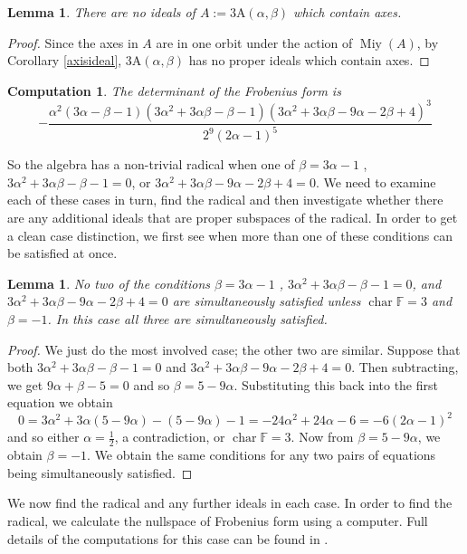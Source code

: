 \documentclass[11pt, a4paper]{article}
\theoremstyle{plain}
\newtheorem{lemma}[theorem]{Lemma}
\newtheorem{computation}[theorem]{Computation}
\theoremstyle{definition}
\newcommand\al{\alpha}
\newcommand\bt{\beta}
\DeclareMathOperator{\ch}{char}
\newcommand\FF{\mathbb{F}}
\newcommand{\A}{\mathrm{A}}
\DeclareMathOperator{\Miy}{Miy}
\newcommand{\0}{\overline{0}}
\newcommand{\2}{\overline{2}}
\newcommand{\1}{\mathbbm{1}}
\begin{document}
\begin{lemma}
There are no ideals of $A := 3\A(\al,\bt)$ which contain axes.
\end{lemma}
\begin{proof}
Since the axes in $A$ are in one orbit under the action of $\Miy(A)$, by Corollary \ref{axisideal}, $3\A(\al,\bt)$ has no proper ideals which contain axes.
\end{proof}

\begin{computation}\label{3Adet}
The determinant of the Frobenius form is
\[
-\frac{\al^2  (3\al - \bt - 1)  (3\al^2 + 3\al\bt - \bt - 1) (3\al^2 + 3\al\bt - 9\al - 2\bt + 4)^3}{2^9  (2\al - 1)^5}
\]
\end{computation}

So the algebra has a non-trivial radical when one of $\bt = 3\al - 1$ , $3\al^2 + 3\al\bt - \bt - 1 = 0$, or $3\al^2 + 3\al\bt - 9\al - 2\bt + 4 = 0$.  We need to examine each of these cases in turn, find the radical and then investigate whether there are any additional ideals that are proper subspaces of the radical.  In order to get a clean case distinction, we first see when more than one of these conditions can be satisfied at once.

\begin{lemma}\label{3Acases}
No two of the conditions $\bt = 3\al - 1$ , $3\al^2 + 3\al\bt - \bt - 1 = 0$, and $3\al^2 + 3\al\bt - 9\al - 2\bt + 4 = 0$ are simultaneously satisfied unless $\ch \FF = 3$ and $\bt = -1$.  In this case all three are simultaneously satisfied.
\end{lemma}
\begin{proof}
We just do the most involved case; the other two are similar.  Suppose that both $3\al^2 + 3\al\bt - \bt - 1 = 0$ and $3\al^2 + 3\al\bt - 9\al - 2\bt + 4 = 0$.  Then subtracting, we get $9\al + \bt - 5 = 0$ and so $\bt = 5 - 9\al$.  Substituting this back into the first equation we obtain
\[
0 = 3\al^2 + 3\al(5-9\al) -(5-9\al) -1 = -24\al^2 + 24\al - 6 = -6(2\al-1)^2
\]
and so either $\al = \frac{1}{2}$, a contradiction, or $\ch \FF = 3$.  Now from $\bt = 5-9\al$, we obtain $\bt = -1$.  We obtain the same conditions for any two pairs of equations being simultaneously satisfied.
\end{proof}

We now find the radical and any further ideals in each case.  In order to find the radical, we calculate the nullspace of Frobenius form using a computer.  Full details of the computations for this case can be found in \cite[X3.m]{githubcode}.
\end{document}
